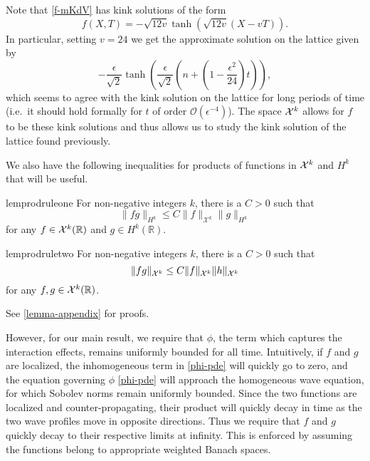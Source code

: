Note that \cref{f-mKdV} has kink solutions of the form
\begin{equation}\label{kink-solutions}
	f(X,T) = - \sqrt{12 v} \tanh\left( \sqrt{12v} (X-vT)\right).
\end{equation}
In particular, setting \(v = 24\) we get the approximate solution on the lattice given by
\begin{equation*}
	- \frac \epsilon {\sqrt 2} \tanh\left(\frac \epsilon {\sqrt 2} \left(n + \left(1-\frac{\epsilon^2} {24}\right) t\right)\right),
\end{equation*} which seems to agree with the kink solution on the lattice for long periods of time (i.e.\ it should hold formally for \(t\) of order \(\mathcal O(\epsilon^{-4})\)). The space \(\mathcal{X}^k\) allows for \(f\) to be these kink solutions and thus allows us to study the kink solution of the lattice found previously. 

We also have the following inequalities for products of functions in \(\mathcal{X}^k\) and \(H^k\) that will be useful. 

	
\begin{restatable}{lem}{prodruleone}
	\label{prod-rule-1-lem}
	For non-negative integers \(k\), there is a \(C>0\) such that
	\begin{equation}\label{prod_rule}
		\| fg \|_{H^k} \leq C \| f \|_{\mathcal X^k} \| g \|_{H^k}
	\end{equation}
	for any \(f\in \mathcal{X}^k(\mathbb R)\) and \(g \in H^k(\mathbb R)\).
\end{restatable}

\begin{restatable}{lem}{prodruletwo}
	\label{prod-rule-2-lem}
	For non-negative integers \(k\), there is a \(C>0\) such that
	\begin{equation*}\label{prod_rule_2}
		\| fg \|_{\mathcal{X}^k} \leq C \| f \|_{\mathcal{X}^k} \| h \|_{\mathcal{X}^k}
	\end{equation*}
	for any \(f,g\in \mathcal{X}^k(\mathbb R)\).
\end{restatable}
See \cref{lemma-appendix} for proofs.

However, for our main result, we require that \(\phi\), the term which captures the interaction effects, remains uniformly bounded for all time. Intuitively, if \(f\) and \(g\) are localized, the inhomogeneous term in \cref{phi-pde} will quickly go to zero, and the equation governing \(\phi\) \cref{phi-pde} will approach the homogeneous wave equation, for which Sobolev norms remain uniformly bounded. Since the two functions are localized and counter-propagating, their product will quickly decay in time as the two wave profiles move in opposite directions. Thus we require that \(f\) and \(g\) quickly decay to their respective limits at infinity. This is enforced by assuming the functions belong to appropriate weighted Banach spaces.

